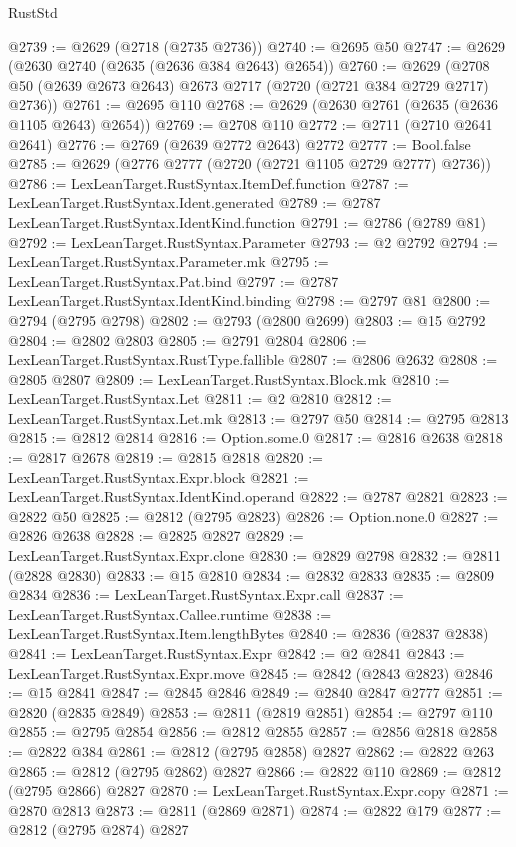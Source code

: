\begin{lexlean}{RustStd}
\begin{coremodule}
{\begin{coremodule}
{{{{{{{{{{{{{{{{{{{{{{{{{{{{{{{{{@2739 := @2629 (@2718 (@2735 @2736))
@2740 := @2695 @50
@2747 := @2629 (@2630 @2740 (@2635 (@2636 @384 @2643) @2654))
@2760 := @2629 (@2708 @50 (@2639 @2673 @2643) @2673 @2717 (@2720 (@2721 @384 @2729 @2717) @2736))
@2761 := @2695 @110
@2768 := @2629 (@2630 @2761 (@2635 (@2636 @1105 @2643) @2654))
@2769 := @2708 @110
@2772 := @2711 (@2710 @2641 @2641)
@2776 := @2769 (@2639 @2772 @2643) @2772
@2777 := Bool.false
@2785 := @2629 (@2776 @2777 (@2720 (@2721 @1105 @2729 @2777) @2736))
@2786 := LexLeanTarget.RustSyntax.ItemDef.function
@2787 := LexLeanTarget.RustSyntax.Ident.generated
@2789 := @2787 LexLeanTarget.RustSyntax.IdentKind.function
@2791 := @2786 (@2789 @81)
@2792 := LexLeanTarget.RustSyntax.Parameter
@2793 := @2 @2792
@2794 := LexLeanTarget.RustSyntax.Parameter.mk
@2795 := LexLeanTarget.RustSyntax.Pat.bind
@2797 := @2787 LexLeanTarget.RustSyntax.IdentKind.binding
@2798 := @2797 @81
@2800 := @2794 (@2795 @2798)
@2802 := @2793 (@2800 @2699)
@2803 := @15 @2792
@2804 := @2802 @2803
@2805 := @2791 @2804
@2806 := LexLeanTarget.RustSyntax.RustType.fallible
@2807 := @2806 @2632
@2808 := @2805 @2807
@2809 := LexLeanTarget.RustSyntax.Block.mk
@2810 := LexLeanTarget.RustSyntax.Let
@2811 := @2 @2810
@2812 := LexLeanTarget.RustSyntax.Let.mk
@2813 := @2797 @50
@2814 := @2795 @2813
@2815 := @2812 @2814
@2816 := Option.some.{0}
@2817 := @2816 @2638
@2818 := @2817 @2678
@2819 := @2815 @2818
@2820 := LexLeanTarget.RustSyntax.Expr.block
@2821 := LexLeanTarget.RustSyntax.IdentKind.operand
@2822 := @2787 @2821
@2823 := @2822 @50
@2825 := @2812 (@2795 @2823)
@2826 := Option.none.{0}
@2827 := @2826 @2638
@2828 := @2825 @2827
@2829 := LexLeanTarget.RustSyntax.Expr.clone
@2830 := @2829 @2798
@2832 := @2811 (@2828 @2830)
@2833 := @15 @2810
@2834 := @2832 @2833
@2835 := @2809 @2834
@2836 := LexLeanTarget.RustSyntax.Expr.call
@2837 := LexLeanTarget.RustSyntax.Callee.runtime
@2838 := LexLeanTarget.RustSyntax.Item.lengthBytes
@2840 := @2836 (@2837 @2838)
@2841 := LexLeanTarget.RustSyntax.Expr
@2842 := @2 @2841
@2843 := LexLeanTarget.RustSyntax.Expr.move
@2845 := @2842 (@2843 @2823)
@2846 := @15 @2841
@2847 := @2845 @2846
@2849 := @2840 @2847 @2777
@2851 := @2820 (@2835 @2849)
@2853 := @2811 (@2819 @2851)
@2854 := @2797 @110
@2855 := @2795 @2854
@2856 := @2812 @2855
@2857 := @2856 @2818
@2858 := @2822 @384
@2861 := @2812 (@2795 @2858) @2827
@2862 := @2822 @263
@2865 := @2812 (@2795 @2862) @2827
@2866 := @2822 @110
@2869 := @2812 (@2795 @2866) @2827
@2870 := LexLeanTarget.RustSyntax.Expr.copy
@2871 := @2870 @2813
@2873 := @2811 (@2869 @2871)
@2874 := @2822 @179
@2877 := @2812 (@2795 @2874) @2827
}}}}}}}}}}}}}}}}}}}}}}}}}}}}}}}}}
\end{coremodule}}
\end{coremodule}
\end{lexlean}
